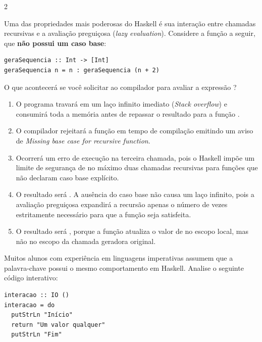 \documentclass[a4paper,10pt,brazil]{article}
\begin{document}
\begin{multicols}{2}
\begin{enumerate}
\end{enumerate}

Uma das propriedades mais poderosas do Haskell é sua interação entre chamadas recursivas e a avaliação preguiçosa (\emph{lazy evaluation}). Considere a função a seguir, que \textbf{não possui um caso base}:

\begin{verbatim}
geraSequencia :: Int -> [Int]
geraSequencia n = n : geraSequencia (n + 2)
\end{verbatim}

O que acontecerá se você solicitar ao compilador para avaliar a expressão ?

\begin{enumerate}
  \item O programa travará em um laço infinito imediato (\emph{Stack overflow}) e consumirá toda a memória antes de repassar o resultado para a função .

  \item O compilador rejeitará a função  em tempo de compilação emitindo um aviso de \emph{Missing base case for recursive function}.

  \item Ocorrerá um erro de execução na terceira chamada, pois o Haskell impõe um limite de segurança de no máximo duas chamadas recursivas para funções que não declaram caso base explícito.
  \item O resultado será \haskellinline{[10, 12, 14]}. A ausência do caso base não causa um laço infinito, pois a avaliação preguiçosa expandirá a recursão apenas o número de vezes estritamente necessário para que a função  seja satisfeita.

  \item O resultado será \haskellinline{[10, 10, 10]}, porque a função atualiza o valor de  no escopo local, mas não no escopo da chamada geradora original.


\end{enumerate}

Muitos alunos com experiência em linguagens imperativas assumem que a palavra-chave  possui o mesmo comportamento em Haskell. Analise o seguinte código interativo:

\begin{verbatim}
interacao :: IO ()
interacao = do
  putStrLn "Início"
  return "Um valor qualquer"
  putStrLn "Fim"
\end{verbatim}


\end{multicols}
\end{document}
